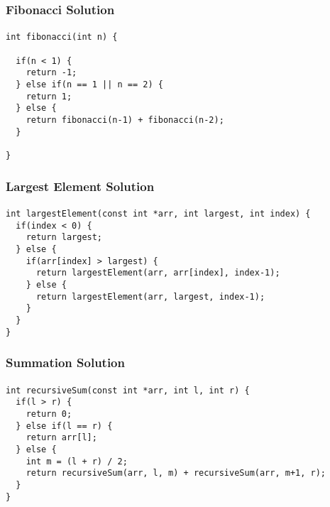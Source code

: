 \documentclass[]{beamer}
\begin{document}
\begin{frame}[fragile]
  \frametitle{Fibonacci Solution}
  \framesubtitle{}

\begin{verbatim}
int fibonacci(int n) {

  if(n < 1) {
    return -1;
  } else if(n == 1 || n == 2) {
    return 1;
  } else {
    return fibonacci(n-1) + fibonacci(n-2);
  }

}
\end{verbatim}

\end{frame}


\begin{frame}[fragile]
  \frametitle{Largest Element Solution}
  \framesubtitle{}

\begin{verbatim}
int largestElement(const int *arr, int largest, int index) {
  if(index < 0) {
    return largest;
  } else {
    if(arr[index] > largest) {
      return largestElement(arr, arr[index], index-1);
    } else {
      return largestElement(arr, largest, index-1);      
    }
  }
}
\end{verbatim}

\end{frame}


\begin{frame}[fragile]
  \frametitle{Summation Solution}
  \framesubtitle{}

\begin{verbatim}
int recursiveSum(const int *arr, int l, int r) {
  if(l > r) {
    return 0;
  } else if(l == r) {
    return arr[l];
  } else {
    int m = (l + r) / 2;
    return recursiveSum(arr, l, m) + recursiveSum(arr, m+1, r);      
  }
}
\end{verbatim}

\end{frame}
\end{document}
